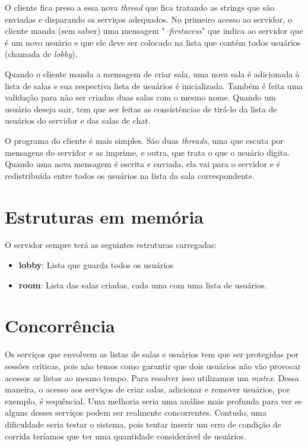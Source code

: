 \documentclass[a4paper, 11pt]{article} %
\begin{document}
O cliente fica preso a essa nova \textit{thread} que fica tratando as strings que são enviadas e disparando os serviços adequados. No primeiro acesso ao servidor, o cliente manda (sem saber) uma mensagem "\textit{--firstacess}" que indica ao servidor que é um novo usuário e que ele deve ser colocado na lista que contém todos usuários (chamada de \textit{lobby}).

Quando o cliente manda a mensagem de criar sala, uma nova sala é adicionada à lista de salas e sua respectiva lista de usuários é inicializada. Também é feita uma validação para não ser criadas duas salas com o mesmo nome. Quando um usuário deseja sair, tem que ser feitas as consistências de tirá-lo da lista de usuários do servidor e das salas de chat.

O programa do cliente é mais simples. São duas \textit{threads}, uma que escuta por mensagens do servidor e as imprime, e outra, que trata o que o usuário digita. Quando uma nova mensagem é escrita e enviada, ela vai para o servidor e é redistribuída entre todos os usuários na lista da sala correspondente.


\section*{Estruturas em memória}

O servidor sempre terá as seguintes estruturas carregadas:

\begin{itemize}
\item \textbf{lobby}: Lista que guarda todos os usuários
\item \textbf{room}: Lista das salas criadas, cada uma com uma lista de usuários.
\end{itemize}

\section*{Concorrência}

Os serviços que envolvem as listas de salas e usuários tem que ser protegidas por sessões críticas, pois não temos como garantir que dois usuários não vão provocar acessos as listas ao mesmo tempo. Para resolver isso utilizamos um \textit{mutex}. Dessa maneira, o acesso aos serviços de criar salas, adicionar e remover usuários, por exemplo, é sequêncial. Uma melhoria seria uma análise mais profunda para ver se alguns desses serviços podem ser realmente concorrentes. Contudo, uma dificuldade seria testar o sistema, pois tentar inserir um erro de condição de corrida teríamos que ter uma quantidade considerável de usuários.
\end{document}
